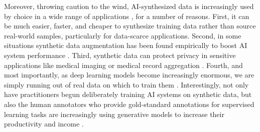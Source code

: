 \documentclass{article}
\begin{document}
Moreover, throwing caution to the wind, AI-synthesized data is increasingly used by choice in a wide range of applications \cite{is_synthetic_data_ready, diversity_is_definitely_needed, leaving_reality_to_imagination, explore_the_power, aug_gpt,baize}, for a number of reasons.
First, it can be much easier, faster, and cheaper to synthesize training data rather than source real-world samples, particularly for data-scarce applications.
Second, in some situations synthetic data augmentation has been found empirically to boost AI system performance \cite{azizi2023synthetic, burg2023data, boomerang}. 
Third, synthetic data can protect privacy \cite{boomerang, ldfa, generation_of_anonymous_chest} in sensitive applications like medical imaging or medical record aggregation \cite{generation_of_anonymous_chest, overcoming_barriers_to_data_sharing}. 
Fourth, and most importantly, as deep learning models become increasingly enormous, we are simply running out of real data on which to train them 
\cite{bigger_is_better, large_creative_ai, will_we_run_out}. Interestingly, not only have practitioners begun deliberately training AI systems on synthetic data, but also the human annotators who provide gold-standard annotations for supervised learning tasks are increasingly using generative models to increase their productivity and income \cite{artificial_artificial_artificial}. 
\end{document}
